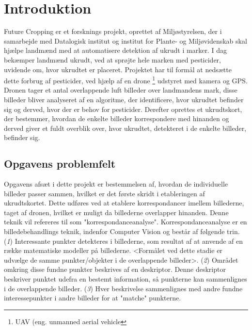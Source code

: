 \chapter{Introduktion} \label{sec:intro}
Future Cropping er et forsknings projekt, oprettet af Miljøstyrelsen, der i samarbejde med Datalogisk institut og institut for Plante- og Miljøvidenskab skal hjælpe landmænd med at automatisere detektion af ukrudt i marker. I dag bekæmper landmænd ukrudt, ved at sprøjte hele marken med pesticider, uvidende om, hvor ukrudtet er placeret. Projektet har til formål at nedsætte dette forbrug af pesticider, ved hjælp af en drone \footnote{UAV (eng. unmanned aerial vehicle} udstyret med kamera og GPS. Dronen tager et antal overlappende luft billeder over landmandens mark, disse billeder bliver analyseret af en algoritme, der identificere, hvor ukrudtet befinder sig og derved, hvor der er behov for pesticider. Derefter oprettes et ukrudtskort, der bestemmer, hvordan de enkelte billeder korrespondere med hinanden og derved giver et fuldt overblik over, hvor ukrudtet, detekteret i de enkelte billeder, befinder sig\cite{drone}.
\section{Opgavens problemfelt} \label{subsec:felt}
Opgavens afsæt i dette projekt er bestemmelsen af, hvordan de individuelle billeder passer sammen, hvilket er det første skridt i etableringen af ukrudtskortet. Dette udføres ved at etablere korrespondancer imellem billederne, taget af dronen, hvilket er muligt da billederne overlapper hinanden. Denne teknik vil refereres til som "korrespondanceanalyse". Korrespondanceanalyse er en billedebehandlings teknik, indenfor Computer Vision og består af følgende trin. (\textit{1}) Interessante punkter detekteres i billederne, som resultat af at anvende af en række matematiske modeller på billederne. <Formålet ved dette stadie er udvælge de samme punkter/objekter i de overlappende billeder>. (\textit{2}) Området omkring disse fundne punkter beskrives af en deskriptor. Denne deskriptor beskriver punktet udefra en bestemt information, så punkterne kan sammenlignes i de overlappende billeder. (\textit{3}) Hver beskrivelse sammenlignes med andre fundne interessepunkter i andre billeder for at "matche" punkterne.
